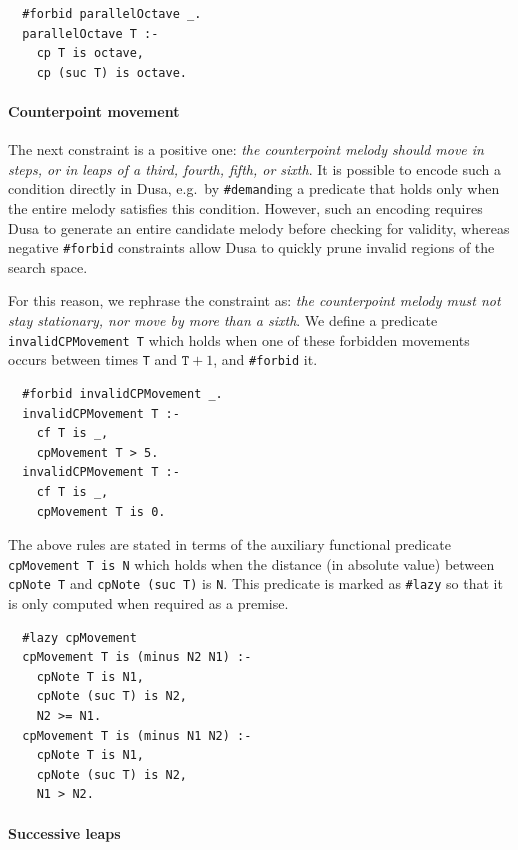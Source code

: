\begin{verbatim}
  #forbid parallelOctave _.
  parallelOctave T :-
    cp T is octave,
    cp (suc T) is octave.
\end{verbatim}



\paragraph{Counterpoint movement}

The next constraint is a positive one: \emph{the counterpoint melody should move in steps, or in leaps of a third, fourth, fifth, or sixth}. It is possible to encode such a condition directly in Dusa, e.g.\ by \verb|#demand|ing a predicate that holds only when the entire melody satisfies this condition. However, such an encoding requires Dusa to generate an entire candidate melody before checking for validity, whereas negative \verb|#forbid| constraints allow Dusa to quickly prune invalid regions of the search space.

For this reason, we rephrase the constraint as: \emph{the counterpoint melody must not stay stationary, nor move by more than a sixth}. We define a predicate \verb|invalidCPMovement T| which holds when one of these forbidden movements occurs between times \verb|T| and $\mathtt{T}+1$, and \verb|#forbid| it.

\begin{verbatim}
  #forbid invalidCPMovement _.
  invalidCPMovement T :-
    cf T is _,
    cpMovement T > 5.
  invalidCPMovement T :-
    cf T is _,
    cpMovement T is 0.
\end{verbatim}

The above rules are stated in terms of the auxiliary functional predicate \verb|cpMovement T is N| which holds when the distance (in absolute value) between \verb|cpNote T| and \verb|cpNote (suc T)| is \verb|N|. This predicate is marked as \verb|#lazy| so that it is only computed when required as a premise.

\begin{verbatim}
  #lazy cpMovement
  cpMovement T is (minus N2 N1) :-
    cpNote T is N1,
    cpNote (suc T) is N2,
    N2 >= N1.
  cpMovement T is (minus N1 N2) :-
    cpNote T is N1,
    cpNote (suc T) is N2,
    N1 > N2.
\end{verbatim}



\paragraph{Successive leaps}

